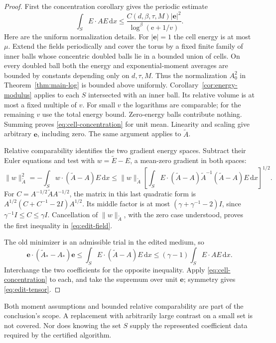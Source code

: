 \documentclass[11pt,a4paper]{article}
\numberwithin{equation}{section}
\theoremstyle{definition}
\theoremstyle{remark}\newtheorem{remark}[theorem]{Remark}
\newcommand{\ee}{\mathrm e}
\newcommand{\Id}{I}
\newcommand{\dd}{\,\mathrm dx}
\newcommand{\norm}[1]{\lVert #1\rVert}
\newcommand{\evec}{\boldsymbol e}
\begin{document}
\begin{proof}
First the concentration corollary gives the periodic estimate
\begin{equation}\label{eq:cell-concentration}
 \int_S E\cdot AE\dd
 \leq\frac{C(d,\beta,\tau,M)|\evec|^2}
                     {\log^\beta(\ee+1/v)}.
\end{equation}
Here are the uniform normalization details. For \(|\evec|=1\)
the cell energy is at most \(\mu\). Extend the fields periodically
and cover the torus by a fixed finite family of inner balls whose
concentric doubled balls lie in a bounded union of cells.
On every doubled ball both the energy and exponential-moment
averages are bounded by constants depending only on \(d,\tau,M\).
Thus the normalization \(A_0^2\) in
Theorem~\ref{thm:main-log} is bounded above uniformly.
Corollary~\ref{cor:energy-modulus} applies to each \(S\) intersected
with an inner ball. Its relative volume is at most a fixed
multiple of \(v\). For small \(v\) the logarithms are comparable;
for the remaining \(v\) use the total energy bound.
Zero-energy balls contribute nothing. Summing proves
\eqref{eq:cell-concentration} for unit mean.
Linearity and scaling give arbitrary \(\evec\), including zero.
The same argument applies to \(\widetilde A\).

Relative comparability identifies the two gradient energy spaces.
Subtract their Euler equations and test with
\(w=\widetilde E-E\), a mean-zero gradient in both spaces:
\[
 \norm w_{\widetilde A}^2
 =-\int_S w\cdot(\widetilde A-A)E\dd
 \leq\norm w_{\widetilde A}
 \left[\int_S E\cdot
       (\widetilde A-A)\widetilde A^{-1}(\widetilde A-A)E\dd
 \right]^{1/2}.
\]
For \(C=A^{-1/2}\widetilde A A^{-1/2}\), the matrix in this
last quadratic form is
\(A^{1/2}(C+C^{-1}-2\Id)A^{1/2}\).
Its middle factor is at most
\((\gamma+\gamma^{-1}-2)\Id\), since
\(\gamma^{-1}\Id\leq C\leq\gamma\Id\).
Cancellation of \(\norm w_{\widetilde A}\), with the zero case
understood, proves the first inequality in \eqref{eq:edit-field}.

The old minimizer is an admissible trial in the edited medium, so
\[
 \evec\cdot(\widetilde A_*-A_*)\evec
 \leq\int_S E\cdot(\widetilde A-A)E\dd
 \leq(\gamma-1)\int_S E\cdot AE\dd .
\]
Interchange the two coefficients for the opposite inequality.
Apply \eqref{eq:cell-concentration} to each, and take the
supremum over unit \(\evec\); symmetry gives \eqref{eq:edit-tensor}.
\end{proof}

Both moment assumptions and bounded relative comparability are
part of the conclusion's scope. A replacement with arbitrarily
large contrast on a small set is not covered. Nor does knowing
the set \(S\) supply the represented coefficient data required
by the certified algorithm.
\end{document}
